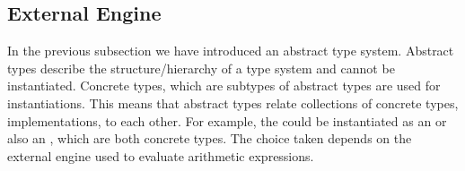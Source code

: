 
























\subsection{External Engine}\label{sec:external_engine}

In the previous subsection we have introduced an abstract type system.
Abstract types describe the structure/hierarchy of a type system and cannot be instantiated. Concrete types, which are subtypes of abstract types are used for instantiations. This means that abstract types relate collections of concrete types, \ie implementations, to each other. For example, the   could be instantiated as an  or also an , which are both concrete types. The choice taken depends on the external engine used to evaluate arithmetic expressions. 

